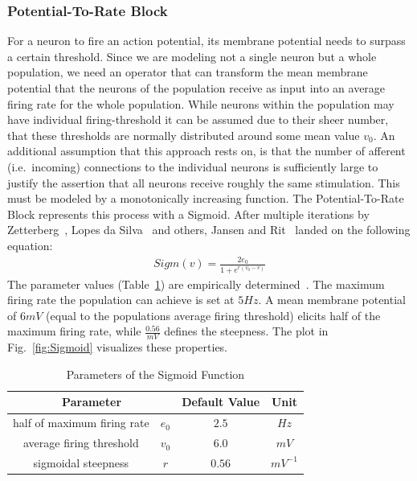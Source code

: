 \subsubsection{Potential-To-Rate Block}
For a neuron to fire an action potential, its membrane potential needs to surpass a certain threshold.
Since we are modeling not a single neuron but a whole population, we need an operator that can transform
the mean membrane potential that the neurons of the population receive as input into an average firing rate
for the whole population.
While neurons within the population may have individual firing-threshold%
it can be assumed due to their sheer number,
that these thresholds are normally distributed around some mean value $v_0$. %
An additional assumption that this approach rests on,
is that the number of afferent (i.e.\ incoming) connections to the individual neurons is sufficiently
large to justify the assertion that all neurons receive roughly the same stimulation.
This must be modeled by a monotonically increasing function.
The Potential-To-Rate Block represents this process with a Sigmoid.
After multiple iterations by Zetterberg~\cite{zetterberg_performance_1978},
Lopes da Silva~\cite{lopes_da_silva_models_1976} and others,
Jansen and Rit~\cite{jansen_neurophysiologically-based_1993,
    jansen_electroencephalogram_1995} landed on the following equation:
\begin{align}
    Sigm(v) = \frac{2e_0}{1+e^{r(v_0-v)}} \label{eq:SigmJansenRit}
\end{align}
The parameter values (Table~\ref{tab:sigmoid_params}) are empirically
determined~\parencite{jansen_neurophysiologically-based_1993}.
The maximum firing rate the population can achieve is set at $5 Hz$.
A mean membrane potential of $6 mV$ (equal to the populations average firing threshold) elicits half
of the maximum firing rate, while $\frac{0.56}{mV}$ defines the steepness.
The plot in Fig.~\ref{fig:Sigmoid} visualizes these properties.
\begin{table}[H]
    \centering
    \begin{tabular}{ |c|c|c|c| }
        \hline
        \multicolumn{2}{|c|}{Parameter} & Default Value & Unit \\
        \hline
        \hline
        half of maximum firing rate & \(e_0\) & \(2.5\)  & \(Hz\)      \\
        \hline
        average firing threshold    & \(v_0\) & \(6.0\)  & \(mV\)      \\
        \hline
        sigmoidal steepness         & \(r\)   & \(0.56\) & \(mV^{-1}\) \\
        \hline
    \end{tabular}
    \caption{Parameters of the Sigmoid Function}
    \label{tab:sigmoid_params}
\end{table}

